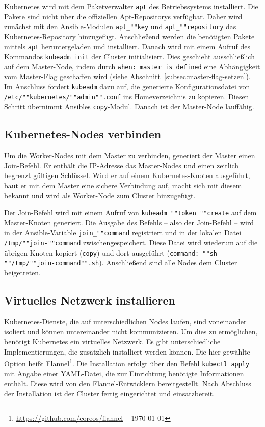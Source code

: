 Kubernetes wird mit dem Paketverwalter \texttt{apt} des Betriebssystems installiert.
Die Pakete sind nicht über die offiziellen Apt-Repositorys verfügbar.
Daher wird zunächst mit den Ansible-Modulen \texttt{apt\_""key} und \texttt{apt\_""repository} das Kubernetes-Repository hinzugefügt.
Anschließend werden die benötigten Pakete mittels \texttt{apt} heruntergeladen und installiert.
Danach wird mit einem Aufruf des Kommandos \texttt{kubeadm init} der Cluster initialisiert.
Dies geschieht ausschließlich auf dem Master-Node, indem durch \texttt{when: master is defined} eine Abhängigkeit vom Master-Flag geschaffen wird (siehe Abschnitt~\ref{subsec:master-flag-setzen}).
Im Anschluss fordert \texttt{kubeadm} dazu auf, die generierte Konfigurationsdatei von \texttt{/etc/""kubernetes/""admin"".conf} ins Homeverzeichnis zu kopieren.
Diesen Schritt übernimmt Ansibles \texttt{copy}-Modul.
Danach ist der Master-Node lauffähig.

\subsection{Kubernetes-Nodes verbinden}\label{subsec:kubernetes-nodes-verbinden}

Um die Worker-Nodes mit dem Master zu verbinden, generiert der Master einen Join-Befehl.
Er enthält die IP-Adresse das Master-Nodes und einen zeitlich begrenzt gültigen Schlüssel.
Wird er auf einem Kubernetes-Knoten ausgeführt, baut er mit dem Master eine sichere Verbindung auf, macht sich mit diesem bekannt und wird als Worker-Node zum Cluster hinzugefügt.

Der Join-Befehl wird mit einem Aufruf von \texttt{kubeadm ""token ""create} auf dem Master-Knoten generiert.
Die Ausgabe des Befehls -- also der Join-Befehl -- wird in der Ansible-Variable \texttt{join\_""command} registriert und in der lokalen Datei \texttt{/tmp/""join-""command} zwischengespeichert.
Diese Datei wird wiederum auf die übrigen Knoten kopiert (\texttt{copy}) und dort ausgeführt (\texttt{command: ""sh ""/tmp/""join-command"".sh}).
Anschließend sind alle Nodes dem Cluster beigetreten.

\subsection{Virtuelles Netzwerk installieren}

Kubernetes-Dienste, die auf unterschiedlichen Nodes laufen, sind voneinander isoliert und können untereinander nicht kommunizieren.
Um dies zu ermöglichen, benötigt Kubernetes ein virtuelles Netzwerk.
Es gibt unterschiedliche Implementierungen, die zusätzlich installiert werden können.
Die hier gewählte Option heißt Flannel\footnote{\url{https://github.com/coreos/flannel} -- \today}.
Die Installation erfolgt über den Befehl \texttt{kubectl apply} mit Angabe einer YAML-Datei, die zur Einrichtung benötigte Informationen enthält.
Diese wird von den Flannel-Entwicklern bereitgestellt.
Nach Abschluss der Installation ist der Cluster fertig eingerichtet und einsatzbereit.

